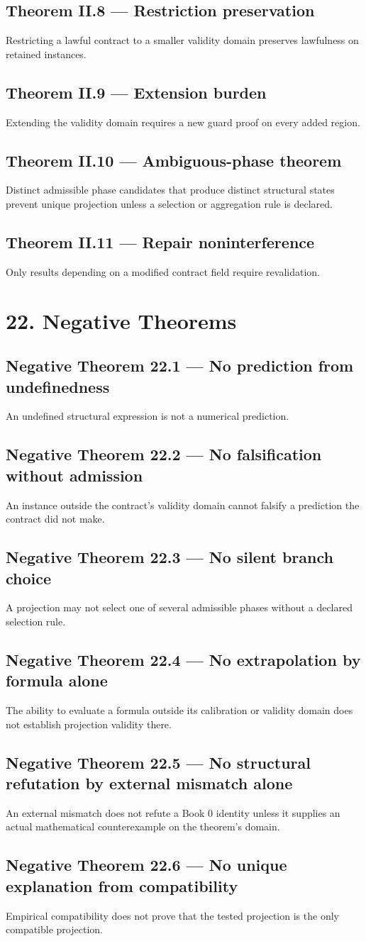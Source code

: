 \documentclass[11pt,oneside,openany]{book}
\newcommand{\PCsection}[1]{%
  \section*{#1}\addcontentsline{toc}{section}{#1}%
}
\newcommand{\PCsubsection}[1]{%
  \subsection*{#1}%
}
\begin{document}
\PCsubsection{Theorem II.8 --- Restriction preservation}

Restricting a lawful contract to a smaller validity domain preserves lawfulness on retained instances.

\PCsubsection{Theorem II.9 --- Extension burden}

Extending the validity domain requires a new guard proof on every added region.

\PCsubsection{Theorem II.10 --- Ambiguous-phase theorem}

Distinct admissible phase candidates that produce distinct structural states prevent unique projection unless a selection or aggregation rule is declared.

\PCsubsection{Theorem II.11 --- Repair noninterference}

Only results depending on a modified contract field require revalidation.


\PCsection{22. Negative Theorems}

\PCsubsection{Negative Theorem 22.1 --- No prediction from undefinedness}

An undefined structural expression is not a numerical prediction.

\PCsubsection{Negative Theorem 22.2 --- No falsification without admission}

An instance outside the contract's validity domain cannot falsify a prediction the contract did not make.

\PCsubsection{Negative Theorem 22.3 --- No silent branch choice}

A projection may not select one of several admissible phases without a declared selection rule.

\PCsubsection{Negative Theorem 22.4 --- No extrapolation by formula alone}

The ability to evaluate a formula outside its calibration or validity domain does not establish projection validity there.

\PCsubsection{Negative Theorem 22.5 --- No structural refutation by external mismatch alone}

An external mismatch does not refute a Book 0 identity unless it supplies an actual mathematical counterexample on the theorem's domain.

\PCsubsection{Negative Theorem 22.6 --- No unique explanation from compatibility}

Empirical compatibility does not prove that the tested projection is the only compatible projection.
\end{document}
